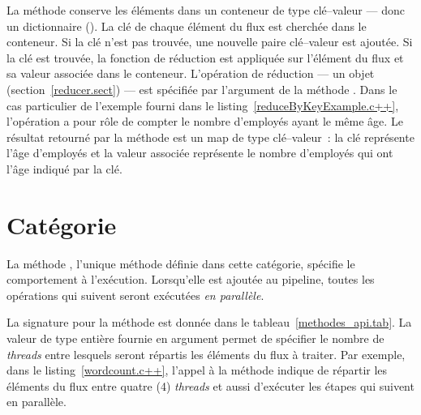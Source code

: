 La m\'ethode  conserve les \'el\'ements dans un conteneur de type cl\'e--valeur --- donc un dictionnaire (). La cl\'e de chaque \'el\'ement du flux est cherch\'ee dans le conteneur. Si la cl\'e n'est pas trouv\'ee, une nouvelle paire cl\'e--valeur est ajout\'ee. Si la cl\'e est trouv\'ee, la fonction de r\'eduction est appliqu\'ee sur l'\'el\'ement du flux et sa valeur associ\'ee dans le conteneur. L'op\'eration de r\'eduction --- un objet  (section~\ref{reducer.sect})  --- est sp\'ecifi\'ee par l'argument de la m\'ethode . Dans le cas particulier de l'exemple fourni dans le listing~\ref{reduceByKeyExample.c++}, l'op\'eration a pour r\^ole de compter le nombre d'employ\'es ayant le m\^eme \^age. Le r\'esultat retourn\'e par la m\'ethode  est un map de type cl\'e--valeur~: la cl\'e repr\'esente l'\^age d'employ\'es et la valeur associ\'ee repr\'esente le nombre d'employ\'es qui ont l'\^age indiqu\'e par la cl\'e.

\section{Cat\'egorie }

\label{execution.sect}


La m\'ethode , l'unique m\'ethode d\'efinie dans cette cat\'egorie, sp\'ecifie le comportement \`a l'ex\'ecution. Lorsqu'elle est ajout\'ee au pipeline, toutes les op\'erations qui suivent seront ex\'ecut\'ees \emph{en parall\`ele}.

La signature pour la m\'ethode  est donn\'ee dans le tableau~\ref{methodes_api.tab}. La valeur de type enti\`ere fournie en argument permet de sp\'ecifier le nombre de \emph{threads} entre lesquels seront r\'epartis les \'el\'ements du flux \`a traiter. Par exemple, dans le listing~\ref{wordcount.c++}, l'appel \`a la méthode  indique de r\'epartir les \'el\'ements du flux entre quatre (4) \emph{threads} et aussi d'ex\'ecuter les \'etapes qui suivent en parall\`ele.

